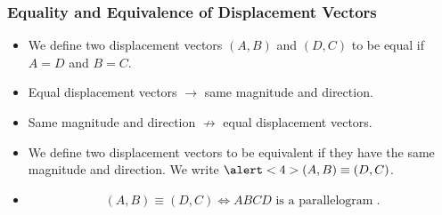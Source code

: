 \begin{frame}
\frametitle{Equality and Equivalence of Displacement Vectors}
\begin{itemize}
\item<1-> We define two displacement vectors $(A,B)$ and $(D,C)$ to be equal if $A=D$ and $B=C$.
\item<2-> Equal displacement vectors $\rightarrow$ same magnitude and direction.
\item<3-> Same magnitude and direction $\not\rightarrow$ equal displacement vectors. 

\item<4-> We define two displacement vectors to be \alert<4>{equivalent} if they have the \alert<4>{same magnitude and direction}. We write $\alert<4>{(A,B) \equiv (D,C)}$.
\item<5-> 
\[ 
(A, B) \equiv (D,C) \Longleftrightarrow ABCD \text{ is a parallelogram}\;.
\]
\end{itemize}
\end{frame}